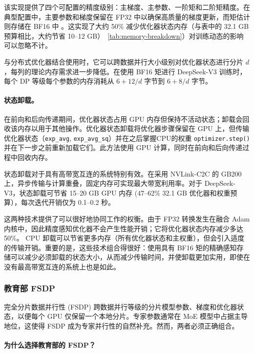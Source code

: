该实现提供了四个可配置的精度级别：主梯度、主参数、一阶矩和二阶矩精度。在典型配置中，主要参数和梯度保留在 FP32 中以确保高质量的梯度更新，而矩估计则存储在 BF16 中 \cite{liu2024deepseek}。这实现了大约 50\% 减少优化器状态内存（与表中的 32.1 GB 预算相比，大约节省 10--12 GB）~\ref{tab:memory-breakdown}）对训练动态的影响可以忽略不计。

与分布式优化器结合使用时，它可以跨数据并行大小级别对优化器状态进行分片 $d$，每列的理论内存需求进一步降低。在使用 BF16 矩进行 DeepSeek-V3 训练时，每个 DP 等级每个参数的内存消耗从 $6+12/d$ 字节到 $6+8/d$ 字节。

\paragraph{状态卸载。}
在前向和后向传递期间，优化器状态占用 GPU 内存但保持不活动状态；卸载会回收该内存以用于其他操作。优化器状态卸载将优化器步骤保留在 GPU 上，但传输优化器状态（\texttt{exp\_avg}, \texttt{exp\_avg\_sq}）并在之后掌握CPU的权重 \texttt{optimizer.step()} 并在下一步之前重新加载它们。此方法使用 GPU 计算，同时在前向和后向传递过程中回收内存。

状态卸载对于具有高带宽互连的系统特别有效。在采用 NVLink-C2C 的 GB200 上，异步传输与计算重叠，固定内存可实现最大带宽利用率。对于 DeepSeek-V3，状态卸载可节省 15--20 GB GPU 内存 (47--62\% 32.1 GB 优化器和权重预算），每次迭代开销仅为 0.1--0.2 秒。

这两种技术提供了可以很好地协同工作的权衡。由于 FP32 转换发生在融合 Adam 内核中，因此精度感知优化器不会产生性能开销；它将优化器状态内存减少多达 50\%。 CPU 卸载可以节省更多内存（所有优化器状态和主权重），但会引入适度的传输开销。重要的是，这些技术组合得很好：使用具有 BF16 矩的精确感知存储可以减少必须卸载的状态大小，从而减少传输时间，并使卸载更加实用，即使在没有最高带宽互连的系统上也是如此。

\subsubsection{教育部 FSDP}\label{sec:fsdp-ref}

完全分片数据并行性 (FSDP) \cite{zhao2023pytorchfsdp,rajbhandari2020zero} 跨数据并行等级的分片模型参数、梯度和优化器状态，​​以便每个 GPU 仅保留一个本地分片。专家参数通常在 MoE 模型中占据主导地位，这使得 FSDP 成为专家并行性的自然补充。然而，两者必须正确组合。

\paragraph{为什么选择教育部的 FSDP？}

